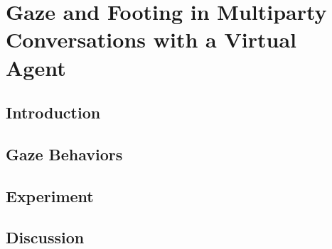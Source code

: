 \pagestyle{deposit}

\chapter{Gaze and Footing in Multiparty Conversations with a Virtual Agent}
\label{cha:GazeFooting}

\section{Introduction}
\label{sec:GazeFootingIntro}
%

\section{Gaze Behaviors}
\label{sec:GazeFootingBehaviors}
%

\section{Experiment}
\label{sec:GazeFootingExperiment}
%

\section{Discussion}
\label{sec:GazeFootingDiscussion}
%
